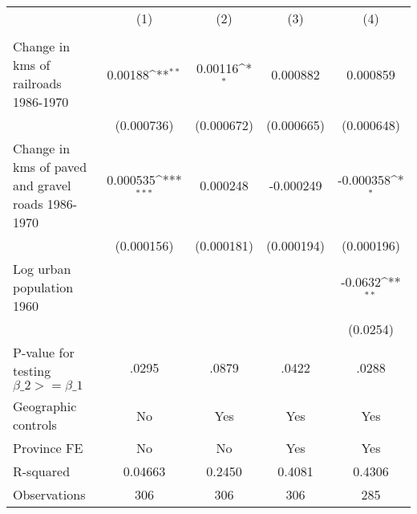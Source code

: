 {
\def\sym#1{\ifmmode^{#1}\else\(^{#1}\)\fi}
\begin{tabular}{l*{4}{c}}
\hline\hline
                &\multicolumn{1}{c}{(1)}&\multicolumn{1}{c}{(2)}&\multicolumn{1}{c}{(3)}&\multicolumn{1}{c}{(4)}\\
                &\multicolumn{1}{c}{}&\multicolumn{1}{c}{}&\multicolumn{1}{c}{}&\multicolumn{1}{c}{}\\
\hline
Change in kms of railroads 1986-1970&  0.00188\sym{**} &  0.00116\sym{*}  & 0.000882         & 0.000859         \\
                &(0.000736)         &(0.000672)         &(0.000665)         &(0.000648)         \\
[1em]
Change in kms of paved and gravel roads 1986-1970& 0.000535\sym{***}& 0.000248         &-0.000249         &-0.000358\sym{*}  \\
                &(0.000156)         &(0.000181)         &(0.000194)         &(0.000196)         \\
[1em]
Log urban population 1960&                  &                  &                  &  -0.0632\sym{**} \\
                &                  &                  &                  & (0.0254)         \\
\hline
P-value for testing $\beta\_{2} >= \beta\_{1}$&    .0295         &    .0879         &    .0422         &    .0288         \\
Geographic controls&       No         &      Yes         &      Yes         &      Yes         \\
Province FE     &       No         &       No         &      Yes         &      Yes         \\
R-squared       &  0.04663         &   0.2450         &   0.4081         &   0.4306         \\
Observations    &      306         &      306         &      306         &      285         \\
\hline\hline
\end{tabular}
}
